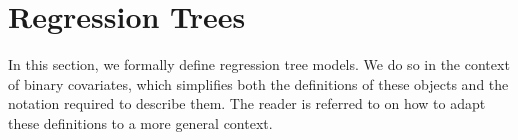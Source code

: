 \documentclass[11pt]{article}
\newcommand{\bx}{\mathbf{x}}
\DeclarePairedDelimiter{\braces}{\lbrace}{\rbrace}
\DeclarePairedDelimiter{\paren}{(}{)}
\newcommand{\R}{\mathbb{R}}
\newcommand{\E}{\mathbb{E}}
\newcommand{\binspace}{\braces{\pm 1}^\nfeats}
\newcommand{\ctsspace}{[0,1]^\nfeats}
\newcommand{\xmeasure}{\nu}
\newcommand{\sparsity}{s}
\newcommand{\nfeats}{d}
\newcommand{\nsamples}{n}
\newcommand{\data}[1][n]{\mathcal{D}_{#1}}
\begin{document}
\section{Regression Trees}
\label{sec:framework}





In this section, we formally define regression tree models.
We do so in the context of binary covariates, which simplifies both the definitions of these objects and the notation required to describe them.
The reader is referred to \cite{friedman2001elements} on how to adapt these definitions to a more general context.
\end{document}
